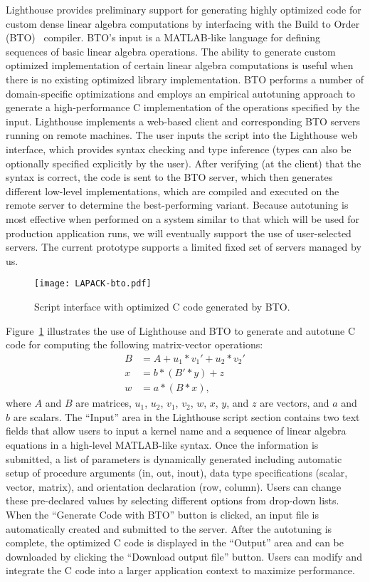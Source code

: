 \documentclass{sig-alternate}
\begin{document}
Lighthouse provides preliminary support for generating highly optimized code for custom dense linear algebra computations 
by interfacing with the Build to Order
(BTO)~\cite{Belter,Siek} compiler. BTO's input is a MATLAB-like language for defining sequences of basic linear algebra operations.
The ability to generate custom 
optimized implementation of certain linear algebra computations is useful when there is no existing optimized library implementation.
BTO performs a number of domain-specific optimizations and employs an empirical autotuning approach to generate a high-performance
C implementation of the operations specified by the input.
Lighthouse implements a web-based client and corresponding BTO servers running on remote machines. 
The user inputs the script into the Lighthouse
web interface, which provides syntax checking and type inference (types can also be optionally specified explicitly by the user). After
verifying (at the client) that the syntax is correct, the code is sent to the BTO server, which then generates different low-level
implementations, which 
are compiled and executed on the remote server to determine the best-performing variant.
Because autotuning is most effective when performed 
on a system similar to that which will be used for production application runs, we will eventually support the use of user-selected servers. 
The current prototype supports a limited fixed set of servers managed by us.

\begin{figure}[ht]
\centering
\texttt{[image: LAPACK-bto.pdf]}
\vspace{-5pt}
\caption{Script interface with optimized C code generated by BTO.}
\label{fig:bto}
\end{figure}

Figure~\ref{fig:bto} illustrates the use of Lighthouse and BTO to generate and autotune C code for computing the following matrix-vector operations:
\begin{align*}
  B &= A + u_1 * v_1' + u_2 * v_2' \\
  x &= b * (B' * y) + z \\
  w &= a * (B * x),
\end{align*}
where $A$ and $B$ are matrices, $u_1$, $u_2$, $v_1$, $v_2$, $w$, $x$, $y$, and $z$ are vectors, and $a$ and $b$ are scalars.
The ``Input'' area in the Lighthouse script section contains two text fields that allow users to input a kernel name and a sequence
of linear algebra equations in a high-level MATLAB-like syntax. Once the information is submitted, a list of parameters is dynamically
generated including automatic setup of procedure arguments (in, out, inout), data type specifications (scalar, vector, matrix), and
orientation declaration (row, column).  Users can change these pre-declared values by selecting different options from drop-down lists. When the
``Generate Code with BTO'' button is clicked, an input file is automatically created and submitted to the server. After the 
autotuning is complete, the
optimized C code is displayed in the ``Output'' area and can be downloaded by clicking the ``Download output file'' button. Users
can modify and integrate the C code into a larger application context to maximize performance. 
\end{document}
